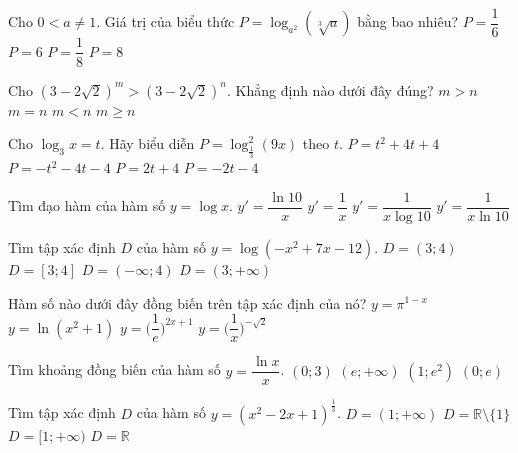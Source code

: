 \begin{ex}%
	Cho $0<a\not= 1$. Giá trị của biểu thức $P=\log_{a^2}(\sqrt[3]{a})$ bằng bao nhiêu?
	\choice
	{\True $P=\dfrac{1}{6}$}
	{$P=6$}
	{$P=\dfrac{1}{8}$}
	{$P=8$}
\end{ex}

\begin{ex}%
	Cho $(3-2\sqrt{2})^m>(3-2\sqrt{2})^n$. Khẳng định nào dưới đây đúng?
	\choice
	{$m>n$}
	{$m=n$}
	{\True $m<n$}
	{$m\geq n$}
\end{ex}


\begin{ex}%
	Cho $\log_3 x=t$. Hãy biểu diễn $P=\log_{\frac{1}{3}}^2(9x)$ theo $t$.
	\choice
	{\True $P=t^2+4t+4$}
	{$P=-t^2-4t-4$}
	{$P=2t+4$}
	{$P=-2t-4$}
\end{ex}

\begin{ex}%
	Tìm đạo hàm của hàm số $y=\log x$.
	\choice
	{$y'=\dfrac{\ln 10}{x}$}
	{$y'=\dfrac{1}{x}$}
	{$y'=\dfrac{1}{x\log 10}$}
	{\True $y'=\dfrac{1}{x\ln 10}$}
\end{ex}
\begin{ex}%
	Tìm tập xác định $D$ của hàm số $y=\log(-x^2+7x-12)$.
	\choice
	{\True $D=(3;4)$}
	{$D=[3;4]$}
	{$D=(-\infty;4)$}
	{$D=(3;+\infty)$}
\end{ex}

\begin{ex}%
	Hàm số nào dưới đây đồng biến trên tập xác định của nó?
	\choice
	{$y=\pi^{1-x}$}
	{$y=\ln(x^2+1)$}
	{$y=\bigg( \dfrac{1}{e} \bigg)^{2x+1}$}
	{\True $y=\bigg(\dfrac{1}{x} \bigg)^{-\sqrt{2}}$}
\end{ex}

\begin{ex}%
	Tìm khoảng đồng biến của hàm số $y=\dfrac{\ln x}{x}$.
	\choice
	{$(0;3)$}
	{$(e;+\infty)$}
	{$(1;e^2)$}
	{\True $(0;e)$}
\end{ex}


\begin{ex}%
	Tìm tập xác định $D$ của hàm số $y=(x^2-2x+1)^{\frac{1}{3}}$.
	\choice
	{$D=(1;+\infty)$}
	{\True $D=\mathbb R\setminus \{1\}$}
	{$D=[1;+\infty)$}
	{$D=\mathbb R$}
\end{ex}

